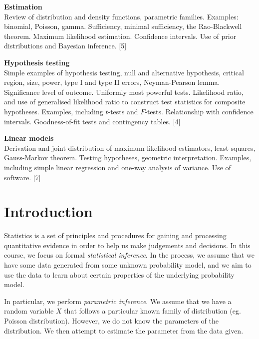 \documentclass[a4paper]{article}
\begin{document}
\maketitle
{\small
\noindent\textbf{Estimation}\\
Review of distribution and density functions, parametric families. Examples: binomial, Poisson, gamma.  Sufficiency, minimal sufficiency, the Rao-Blackwell theorem. Maximum likelihood estimation. Confidence intervals. Use of prior distributions and Bayesian inference.\hspace*{\fill} [5]

\vspace{10pt}
\noindent\textbf{Hypothesis testing}\\
Simple examples of hypothesis testing, null and alternative hypothesis, critical region, size, power, type I and type II errors, Neyman-Pearson lemma. Significance level of outcome. Uniformly most powerful tests. Likelihood ratio, and use of generalised likelihood ratio to construct test statistics for composite hypotheses. Examples, including $t$-tests and $F$-tests. Relationship with confidence intervals. Goodness-of-fit tests and contingency tables.\hspace*{\fill} [4]

\vspace{10pt}
\noindent\textbf{Linear models}\\
Derivation and joint distribution of maximum likelihood estimators, least squares, Gauss-Markov theorem. Testing hypotheses, geometric interpretation. Examples, including simple linear regression and one-way analysis of variance. Use of software.\hspace*{\fill} [7]}

\tableofcontents

\setcounter{section}{-1}
\section{Introduction}
Statistics is a set of principles and procedures for gaining and processing quantitative evidence in order to help us make judgements and decisions. In this course, we focus on formal \emph{statistical inference}. In the process, we assume that we have some data generated from some unknown probability model, and we aim to use the data to learn about certain properties of the underlying probability model.

In particular, we perform \emph{parametric inference}. We assume that we have a random variable $X$ that follows a particular known family of distribution (eg. Poisson distribution). However, we do not know the parameters of the distribution. We then attempt to estimate the parameter from the data given.
\end{document}
